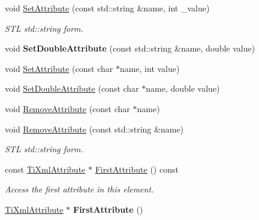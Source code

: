 \begin{DoxyCompactItemize}
void \hyperlink{class_ti_xml_element_a6f18d54fbe25bbc527936ee65363b3c5}{Set\+Attribute} (const std\+::string \&name, int \+\_\+value)
\begin{DoxyCompactList}\small\item\em S\+TL std\+::string form. \end{DoxyCompactList}\item 
\mbox{\label{class_ti_xml_element_ac2112d423b39a93012b241f6baf4d3d3}} 
void {\bfseries Set\+Double\+Attribute} (const std\+::string \&name, double value)
\item 
void \hyperlink{class_ti_xml_element_ace6f4be75e373726d4774073d666d1a7}{Set\+Attribute} (const char $\ast$name, int value)
\item 
void \hyperlink{class_ti_xml_element_a0d1dd975d75496778177e35abfe0ec0b}{Set\+Double\+Attribute} (const char $\ast$name, double value)
\item 
void \hyperlink{class_ti_xml_element_a56979767deca794376b1dfa69a525b2a}{Remove\+Attribute} (const char $\ast$name)
\item 
\mbox{\label{class_ti_xml_element_a1afa6aea716511326a608e4c05df4f3a}} 
void \hyperlink{class_ti_xml_element_a1afa6aea716511326a608e4c05df4f3a}{Remove\+Attribute} (const std\+::string \&name)
\begin{DoxyCompactList}\small\item\em S\+TL std\+::string form. \end{DoxyCompactList}\item 
\mbox{\label{class_ti_xml_element_a003131b1bbf0b8054b11571c1b9a4d3a}} 
const \hyperlink{class_ti_xml_attribute}{Ti\+Xml\+Attribute} $\ast$ \hyperlink{class_ti_xml_element_a003131b1bbf0b8054b11571c1b9a4d3a}{First\+Attribute} () const
\begin{DoxyCompactList}\small\item\em Access the first attribute in this element. \end{DoxyCompactList}\item 
\mbox{\label{class_ti_xml_element_a4b33780fc565d38d6b54f640e0cf1737}} 
\hyperlink{class_ti_xml_attribute}{Ti\+Xml\+Attribute} $\ast$ {\bfseries First\+Attribute} ()
\item 
\mbox{\label{class_ti_xml_element_a42939f55ed4cec5fc1daaecfded7ba16}} 

\end{DoxyCompactItemize}
